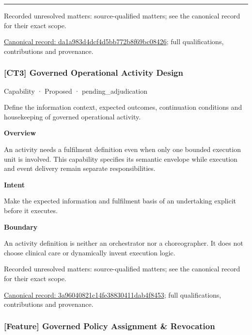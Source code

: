 \medskip\hrule\medskip

{\small Recorded unresolved matters: source-qualified matters; see the canonical record for their exact scope.}\par
{\footnotesize \href{../../../../continuum/strategy/capability/da1a983d4dcf4d5bb772b8f69bc08426.md}{Canonical record: da1a983d4dcf4d5bb772b8f69bc08426}; full qualifications, contributions and provenance.}\par
\subsubsection{[CT3] Governed Operational Activity Design}

\label{element:3a96040821c14fe38830411dab4f8453}
{\small Capability · Proposed · pending\_adjudication}\par

Define the information context, expected outcomes, continuation conditions and housekeeping of governed operational activity.



\textbf{Overview}



An activity needs a fulfilment definition even when only one bounded execution unit is involved. This capability specifies its semantic envelope while execution and event delivery remain separate responsibilities.



\textbf{Intent}



Make the expected information and fulfilment basis of an undertaking explicit before it executes.



\textbf{Boundary}



An activity definition is neither an orchestrator nor a choreographer. It does not choose clinical care or dynamically invent execution logic.


{\small Recorded unresolved matters: source-qualified matters; see the canonical record for their exact scope.}\par
{\footnotesize \href{../../../../continuum/strategy/capability/3a96040821c14fe38830411dab4f8453.md}{Canonical record: 3a96040821c14fe38830411dab4f8453}; full qualifications, contributions and provenance.}\par
\subsubsection{[Feature] Governed Policy Assignment \& Revocation}

